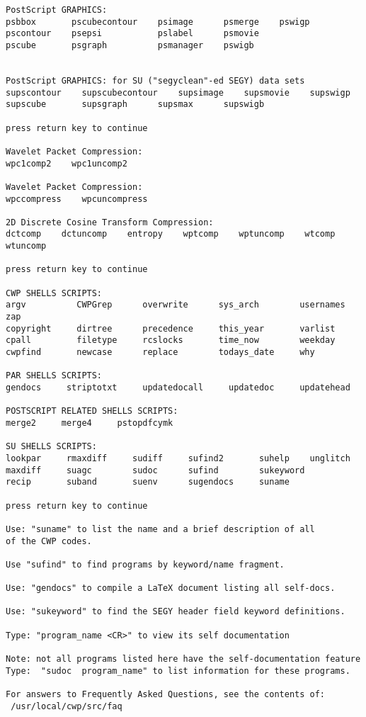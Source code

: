 {\begin{verbatim}
PostScript GRAPHICS:
psbbox       pscubecontour    psimage      psmerge    pswigp  
pscontour    psepsi  	      pslabel      psmovie  
pscube       psgraph  	      psmanager    pswigb  


PostScript GRAPHICS: for SU ("segyclean"-ed SEGY) data sets
supscontour    supscubecontour    supsimage    supsmovie    supswigp  
supscube       supsgraph  	  supsmax      supswigb  

press return key to continue

Wavelet Packet Compression:
wpc1comp2    wpc1uncomp2  

Wavelet Packet Compression:
wpccompress    wpcuncompress  

2D Discrete Cosine Transform Compression:
dctcomp    dctuncomp  	entropy    wptcomp    wptuncomp    wtcomp    wtuncomp  

press return key to continue

CWP SHELLS SCRIPTS:
argv          CWPGrep      overwrite      sys_arch   	  usernames   	zap   
copyright     dirtree      precedence     this_year   	  varlist   
cpall         filetype     rcslocks   	  time_now   	  weekday   
cwpfind       newcase      replace   	  todays_date     why   

PAR SHELLS SCRIPTS:
gendocs     striptotxt     updatedocall     updatedoc     updatehead   

POSTSCRIPT RELATED SHELLS SCRIPTS:
merge2     merge4     pstopdfcymk   

SU SHELLS SCRIPTS:
lookpar     rmaxdiff     sudiff     sufind2   	  suhelp   	unglitch   
maxdiff     suagc   	 sudoc      sufind   	  sukeyword   
recip       suband   	 suenv      sugendocs     suname   

press return key to continue

Use: "suname" to list the name and a brief description of all
of the CWP codes.

Use "sufind" to find programs by keyword/name fragment.

Use: "gendocs" to compile a LaTeX document listing all self-docs.

Use: "sukeyword" to find the SEGY header field keyword definitions.

Type: "program_name <CR>" to view its self documentation

Note: not all programs listed here have the self-documentation feature
Type:  "sudoc  program_name" to list information for these programs.

For answers to Frequently Asked Questions, see the contents of:
 /usr/local/cwp/src/faq

\end{verbatim}}

